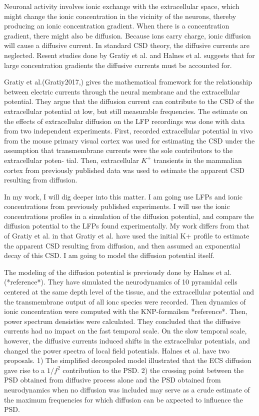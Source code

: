 \documentclass{article}
\begin{document}
Neuronal activity involves ionic exchange with the extracellular space, which might change the ionic concentration in the vicinity of the neurons, thereby producing an ionic concentration gradient. When there is a concentration gradient, there might also be diffusion. Because ions carry charge, ionic diffusion will cause a diffusive current. In standard CSD theory, the diffusive currents are neglected. Resent studies done by Gratiy et al. and Halnes et al. suggests that for large concentration gradients the diffusive currents must be accounted for. 

Gratiy et al.(Gratiy2017,) gives the mathematical framework for the relationship between electric currents through the neural membrane and the extracellular potential. They argue that the diffusion current can contribute to the CSD of the extracellular potential at low, but still measurable frequencies. The estimate on the effects of extracellular diffusion on the LFP recordings was done with data from two independent experiments. First, recorded extracellular potential in vivo from the mouse primary visual cortex was used for estimating the CSD under the assumption that transmembrane currents were the sole contributors to the extracellular poten-
tial. Then, extracellular $K^+$ transients in the mammalian cortex from previously published data was used to estimate the apparent CSD resulting from diffusion. 

In my work, I will dig deeper into this matter. I am going use LFPs and ionic concentrations from previously published experiments. I will use the ionic concentrations profiles in a simulation of the diffusion potential, and compare the diffusion potential to the LFPs found experimentally. My work differs from that of Gratiy et al. in that Gratiy et al. have used the initial K+ profile to estimate the apparent CSD resulting from diffusion, and then assumed an exponential decay of this CSD. I am going to model the diffusion potential itself. 

The modeling of the diffusion potential is previously done by Halnes et al. (*reference*). They have simulated the neurodynamics of 10 pyramidal cells centered at the same depth level of the tissue, and the extracellular potential and the transmembrane output of all ionc species were recorded. Then  dynamics of ionic concentration were computed with the KNP-formailsm *reference*. Then, power spectrum densisties were calculated. They concluded that the diffusive currents had no impact on the fast temporal scale. On the slow temporal scale, however, the diffusive currents induced shifts in the extracellular potentials, and changed the power spectra of local field potentials. Halnes et al. have two proposals. 1) The simplified decoupoled model illustrated that the ECS diffusion gave rise to a $1/f^2$ contribution to the PSD. 2) the crossing point between the PSD obtained from diffusive process alone and the PSD obtained from neurodynamics when no diffusion was included may serve as a crude estimate of the maximum frequencies for which diffusion can be axpected to influence the PSD. 
\end{document}
